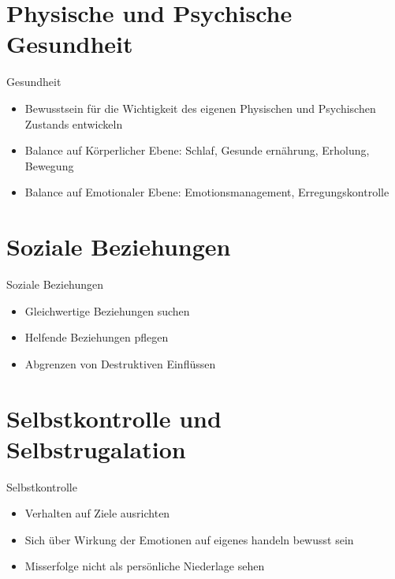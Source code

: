 \section{Physische und Psychische Gesundheit}

\begin{frame}[c]{Gesundheit}
    \begin{itemize}
    \item Bewusstsein für die Wichtigkeit des eigenen Physischen und Psychischen Zustands entwickeln \newline
    \pause
    \item Balance auf Körperlicher Ebene: \pause Schlaf\pause, Gesunde ernährung\pause, Erholung\pause, Bewegung \newline
    \pause
    \item Balance auf Emotionaler Ebene: \pause Emotionsmanagement\pause, Erregungskontrolle
    \end{itemize}
\end{frame}



\section{Soziale Beziehungen}

\begin{frame}[c]{Soziale Beziehungen}
    \begin{itemize}
    \item Gleichwertige Beziehungen suchen \newline
    \pause
    \item Helfende Beziehungen pflegen \newline
    \pause
    \item Abgrenzen von Destruktiven Einflüssen
    \end{itemize}
\end{frame}



\section{Selbstkontrolle und Selbstrugalation}

\begin{frame}[c]{Selbstkontrolle}
    \begin{itemize}
    \item Verhalten auf Ziele ausrichten \newline
    \pause
    \item Sich über Wirkung der Emotionen auf eigenes handeln bewusst sein \newline
    \pause
    \item Misserfolge nicht als persönliche Niederlage sehen
    \end{itemize}
\end{frame}



